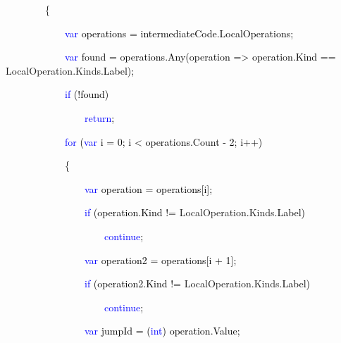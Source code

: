 \documentclass[letterpaper]{article}
\begin{document}
{\color{black}
\ \ \ \ \ \ \ \ \{}

\textcolor{black}{\ \ \ \ \ \ \ \ \ \ \ \ }\textcolor{blue}{var}\textcolor{black}{ operations =
intermediateCode.LocalOperations;}


\bigskip

\textcolor{black}{\ \ \ \ \ \ \ \ \ \ \ \ }\textcolor{blue}{var}\textcolor{black}{ found = operations.Any(operation
={\textgreater} operation.Kind ==
}\textcolor[rgb]{0.16862746,0.5686275,0.6862745}{LocalOperation}\textcolor{black}{.}\textcolor[rgb]{0.16862746,0.5686275,0.6862745}{Kinds}\textcolor{black}{.Label);}

\textcolor{black}{\ \ \ \ \ \ \ \ \ \ \ \ }\textcolor{blue}{if}\textcolor{black}{ (!found)}

\textcolor{black}{\ \ \ \ \ \ \ \ \ \ \ \ \ \ \ \ }\textcolor{blue}{return}\textcolor{black}{;}

\textcolor{black}{\ \ \ \ \ \ \ \ \ \ \ \ }\textcolor{blue}{for}\textcolor{black}{
(}\textcolor{blue}{var}\textcolor{black}{ i = 0; i {\textless} operations.Count - 2; i++)}

{\color{black}
\ \ \ \ \ \ \ \ \ \ \ \ \{}

\textcolor{black}{\ \ \ \ \ \ \ \ \ \ \ \ \ \ \ \ }\textcolor{blue}{var}\textcolor{black}{ operation = operations[i];}

\textcolor{black}{\ \ \ \ \ \ \ \ \ \ \ \ \ \ \ \ }\textcolor{blue}{if}\textcolor{black}{ (operation.Kind !=
}\textcolor[rgb]{0.16862746,0.5686275,0.6862745}{LocalOperation}\textcolor{black}{.}\textcolor[rgb]{0.16862746,0.5686275,0.6862745}{Kinds}\textcolor{black}{.Label)}

\textcolor{black}{\ \ \ \ \ \ \ \ \ \ \ \ \ \ \ \ \ \ \ \ }\textcolor{blue}{continue}\textcolor{black}{;}


\bigskip

\textcolor{black}{\ \ \ \ \ \ \ \ \ \ \ \ \ \ \ \ }\textcolor{blue}{var}\textcolor{black}{ operation2 = operations[i +
1];}

\textcolor{black}{\ \ \ \ \ \ \ \ \ \ \ \ \ \ \ \ }\textcolor{blue}{if}\textcolor{black}{ (operation2.Kind !=
}\textcolor[rgb]{0.16862746,0.5686275,0.6862745}{LocalOperation}\textcolor{black}{.}\textcolor[rgb]{0.16862746,0.5686275,0.6862745}{Kinds}\textcolor{black}{.Label)}

\textcolor{black}{\ \ \ \ \ \ \ \ \ \ \ \ \ \ \ \ \ \ \ \ }\textcolor{blue}{continue}\textcolor{black}{;}

\textcolor{black}{\ \ \ \ \ \ \ \ \ \ \ \ \ \ \ \ }\textcolor{blue}{var}\textcolor{black}{ jumpId =
(}\textcolor{blue}{int}\textcolor{black}{) operation.Value;}
\end{document}
